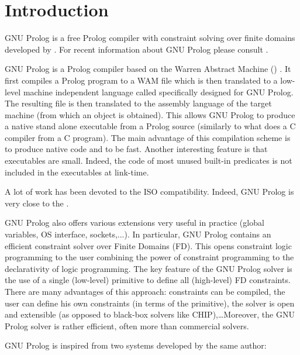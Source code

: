 \newpage
\section{Introduction}

GNU Prolog \cite{gnu-prolog} is a free Prolog compiler with constraint
solving over finite domains developed by
.  For recent
information about GNU Prolog please consult
.

 GNU Prolog is a Prolog compiler
based on the Warren Abstract Machine () \cite{Warren83,Ait-Kaci91}.
It first compiles a Prolog program to a WAM file which is then translated to
a low-level machine independent language called 
specifically designed for GNU Prolog. The resulting file is then translated
to the assembly language of the target machine (from which an object is
obtained). This allows GNU Prolog to produce a native stand alone executable
from a Prolog source (similarly to what does a C compiler from a C program).
The main advantage of this compilation scheme is to produce native code and
to be fast. Another interesting feature is that executables are small.
Indeed, the code of most unused built-in predicates is not included in the
executables at link-time.

A lot of work has been devoted to the ISO compatibility. Indeed, GNU Prolog
is very close to the
 \cite{iso-part1}.

GNU Prolog also offers various extensions very useful in practice (global
variables, OS interface, sockets,...). In particular, GNU Prolog contains an
efficient constraint solver over Finite Domains (FD). This opens constraint
logic programming to the user combining the power of constraint programming to
the declarativity of logic programming. The key feature of the GNU Prolog
solver is the use of a single (low-level) primitive to define all
(high-level) FD constraints. There are many advantages of this approach:
constraints can be compiled, the user can define his own constraints (in
terms of the primitive), the solver is open and extensible (as opposed to
black-box solvers like CHIP),\ldots Moreover, the GNU Prolog solver is rather
efficient, often more than commercial solvers.

GNU Prolog is inspired from two systems developed by the same author:

